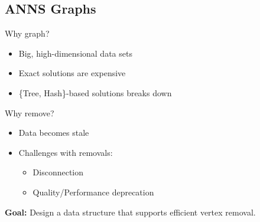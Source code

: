 \subsection{ANNS Graphs}

\begin{frame}{Why graph?}
    \begin{itemize}
        \item Big, high-dimensional data sets
        \item Exact solutions are expensive
        \item \{Tree, Hash\}-based solutions breaks down
    \end{itemize}
\end{frame}

\begin{frame}{Why remove?}
    \begin{itemize}
        \item Data becomes stale
        \item Challenges with removals:
            \begin{itemize}
                \item Disconnection
                \item Quality/Performance deprecation
            \end{itemize}
    \end{itemize}
\end{frame}

\begin{frame}
    \textbf{Goal:} Design a data structure that supports efficient vertex removal.
\end{frame}

